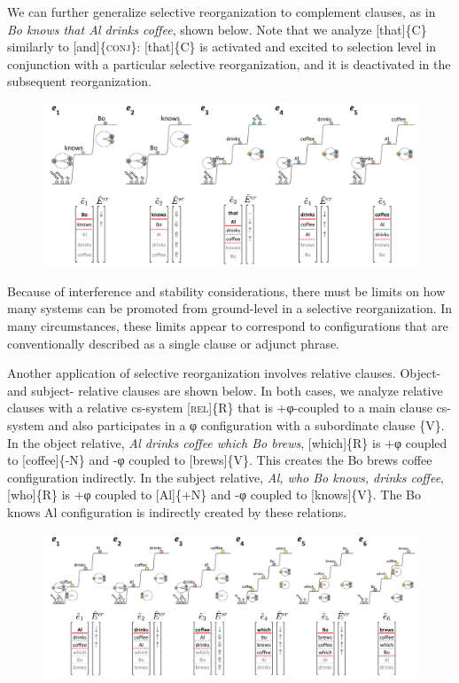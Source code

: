   We can further generalize selective reorganization to complement clauses, as in \textit{Bo knows that Al drinks coffee}, shown below. Note that we analyze [that]\{C\} similarly to [and]\{\textsc{conj}\}: [that]\{C\} is activated and excited to selection level in conjunction with a particular selective reorganization, and it is deactivated in the subsequent reorganization. 

  
\begin{figure}
\includegraphics[width=\textwidth]{figures/Tilsen-img101.png}
\caption{\missingcaption}
\label{fig:4:51}
\end{figure}
 

  Because of interference and stability considerations, there must be limits on how many systems can be promoted from ground-level in a selective reorganization. In many circumstances, these limits appear to correspond to configurations that are conventionally described as a single clause or adjunct phrase.

  Another application of selective reorganization involves relative clauses. Object- and subject- relative clauses are shown below. In both cases, we analyze relative clauses with a relative cs-system [\textsc{rel}]\{R\} that is +φ-coupled to a main clause cs-system and also participates in a φ configuration with a subordinate clause \{V\}. In the object relative, \textit{Al drinks coffee which Bo brews}, [which]\{R\} is +φ coupled to [coffee]\{-N\} and -φ coupled to [brews]\{V\}. This creates the {\textbar}Bo brews coffee{\textbar} configuration indirectly. In the subject relative, \textit{Al, who Bo knows, drinks coffee}, [who]\{R\} is +φ coupled to [Al]\{+N\} and -φ coupled to [knows]\{V\}. The {\textbar}Bo knows Al{\textbar} configuration is indirectly created by these relations.

  
\begin{figure}
\includegraphics[width=\textwidth]{figures/Tilsen-img102.png}
\caption{\missingcaption}
\label{fig:4:52}
\end{figure}
 

